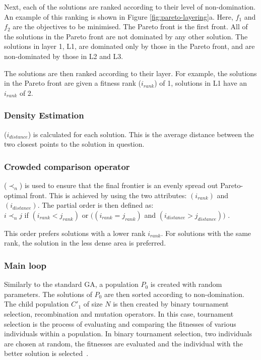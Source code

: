 \documentclass[sigconf]{acmart}
\begin{document}
Next, each of the solutions are ranked according to their level of non-domination. An example of this ranking is shown in Figure \ref{fig:pareto-layering}a. Here, $f_1$ and $f_2$ are the objectives to be minimised. The Pareto front is the first front. All of the solutions in the Pareto front are not dominated by any other solution. The solutions in layer 1, L1, are dominated only by those in the Pareto front, and are non-dominated by those in L2 and L3.

The solutions are then ranked according to their layer. For example, the solutions in the Pareto front are given a fitness rank ($i_{rank}$) of 1, solutions in L1 have an $i_{rank}$ of 2.

\subsubsection{Density Estimation}
($i_{distance}$) is calculated for each solution. This is the average distance between the two closest points to the solution in question. 


\subsubsection{Crowded comparison operator}
($\prec_n$) is used to ensure that the final frontier is an evenly spread out Pareto-optimal front. This is achieved by using the two attributes: $(i_{rank})$ and$(i_{distance})$. 
The partial order is then defined as:\\	
$i\prec_nj$ if $(i_{rank}<j_{rank})$ or $((i_{rank}=j_{rank})$ and  $(i_{distance}>j_{distance}))$ \cite{Valkanas2014}.

This order prefers solutions with a lower rank $i_{rank}$. For solutions with the same rank, the solution in the less dense area is preferred.

\subsubsection{Main loop}

Similarly to the standard GA, a population $P_{0}$ is created with random parameters. The solutions of $P_0$ are then sorted according to non-domination. The child population $C'_{1}$ of size $N$ is then created by binary tournament selection, recombination and mutation operators. In this case, tournament selection is the process of evaluating and comparing the fitnesses of various individuals within a population. In binary tournament selection, two individuals are chosen at random, the fitnesses are evaluated and the individual with the better solution is selected~\cite{AbdRahman2016}. 
\end{document}
